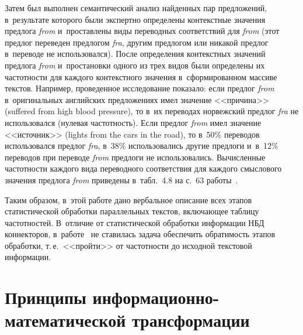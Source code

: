 \begin{multicols}{2}
  Затем был выполнен семантический анализ найден\-ных пар предложений, 
в~результате которого были экспертно определены кон\-текст\-ные значения 
предлога \textit{from} и~про\-став\-ле\-ны виды переводных соответствий для 
\textit{from} (этот пред\-лог переведен предлогом \textit{fra}, другим предлогом или 
никакой пред\-лог в~переводе не использовался). После определения кон\-текст\-ных 
значений предлога \textit{from} и~простановки одного из трех видов были 
определены их час\-тот\-но\-сти для каж\-до\-го кон\-текст\-но\-го значения 
в~сформированном массиве текс\-тов. Например, проведенное исследование 
показало: если пред\-лог \textit{from} в~оригинальных английских предложениях 
имел значение <<причина>> (suffered from high blood pressure), то в~их переводах 
норвежский пред\-лог \textit{fra} не использовался (нулевая час\-тот\-ность). Если 
предлог \textit{from} имел значение <<источник>> (lights from the cars in the road), 
то в~50\% переводов использовался пред\-лог \textit{fra}, в~38\% использовались 
другие предлоги и~в~12\% переводов при переводе \textit{from} пред\-ло\-ги не 
использовались. Вы\-чис\-лен\-ные частотности каж\-до\-го вида переводного 
соответствия для каждого смыс\-ло\-во\-го значения пред\-ло\-га \textit{from} приведены 
в~табл.~4.8 на с.~63 работы~\cite{10-zac}.
  
  Таким образом, в~этой работе дано вербальное описание всех этапов 
ста\-ти\-сти\-че\-ской обработки параллельных текс\-тов, вклю\-ча\-ющее таб\-ли\-цу 
частотностей. В~отличие от ста\-ти\-сти\-че\-ской обработки информации НБД 
коннекторов, в~работе~\cite{10-zac} не ставилась задача обеспечить об\-ра\-ти\-мость 
этапов обработки, т.\,е.\ <<пройти>> от час\-тот\-ности до исходной текс\-то\-вой 
информации.
  
\section{Принципы информационно-математической трансформации}


\end{multicols}
